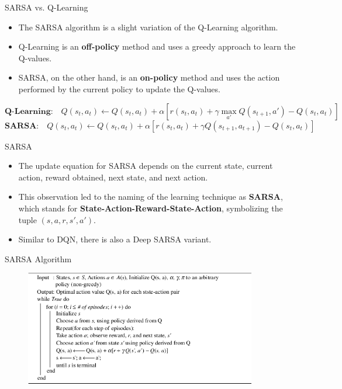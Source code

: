 \begin{frame}{SARSA vs. Q-Learning}
    \begin{itemize}
        \item The SARSA algorithm is a slight variation of the Q-Learning algorithm.
        \item Q-Learning is an \textbf{off-policy} method and uses a greedy approach to learn the Q-values.
        \item SARSA, on the other hand, is an \textbf{on-policy} method and uses the action performed by the current policy to update the Q-values.
    \end{itemize}
    \pause
    \begin{equation*}
        \textbf{Q-Learning:}\quad Q(s_t,a_t) \leftarrow Q(s_t,a_t) + \alpha \left[ r(s_t,a_t) + \gamma \max_{a'} Q(s_{t+1},a') - Q(s_t,a_t) \right]
    \end{equation*}
    \pause
    \begin{equation*}
        \textbf{SARSA:}\quad Q(s_t,a_t) \leftarrow Q(s_t,a_t) + \alpha \left[ r(s_t,a_t) + \gamma Q(s_{t+1},a_{t+1}) - Q(s_t,a_t) \right]
    \end{equation*}
\end{frame}

\begin{frame}{SARSA}
    \begin{itemize}
        \item The update equation for SARSA depends on the current state, current action, reward obtained, next state, and next action.
        \item This observation led to the naming of the learning technique as \textbf{SARSA}, which stands for \textbf{State-Action-Reward-State-Action}, symbolizing the tuple $(s, a, r, s', a')$.
        \pause
        \item Similar to DQN, there is also a Deep SARSA variant.
    \end{itemize}
\end{frame}

\begin{frame}{SARSA Algorithm}
    \begin{figure}
        \centering
        \includegraphics[width=0.9\textwidth,height=0.9\textheight,keepaspectratio]{images/dqn+sarsa/sarsa.png}
    \end{figure}

\end{frame}


